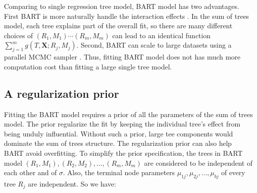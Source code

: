 Comparing to single regression tree model, BART model has two advantages. First BART is more naturally handle the interaction effects . In the sum of trees model, each tree explains part of the overall fit, so there are many different choices of $(R_1,M_1) \cdots (R_m,M_m)$ can lead to an identical function$ \sum\limits_{j = 1}^m {g(T,\pmb{X};{R_j},{M_j})} $. Second, BART can scale to large datasets using a parallel MCMC sampler \cite{Pratola2015}. Thus, fitting BART model does not has much more computation cost than fitting a large single tree model.

\subsection{A regularization prior}
Fitting the BART model requires a prior of all the parameters of the sum of trees model.  The prior regularize the fit by keeping the individual tree's effect from being unduly influential. Without such a prior, large  tee components would dominate the sum of trees structure. The regularization prior can also help BART avoid overfitting. To simplify the prior specification, the trees in BART model $(R_1, M_1), (R_2,M_2), \ldots, (R_m, M_m) $ are considered to be independent of each other and of $\sigma$. Also, the terminal node parameters $ \mu _{1j}, \mu _{2j}, . . ., \mu _{bj} $ of every tree $R_j$ are independent. So we have:

